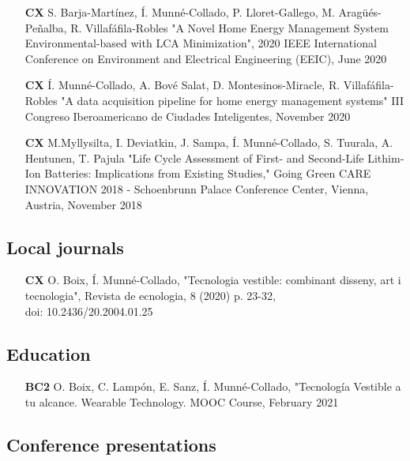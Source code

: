 \begin{itemize}
	\item [\textbf{CX}] S. Barja-Mart\'{i}nez, \'{I}. Munn\'{e}-Collado, P. Lloret-Gallego, M. Arag\"{u}\'{e}s-Pe\~{n}alba, R. Villaf\'{a}fila-Robles "A Novel Home Energy Management System Environmental-based with LCA Minimization", 2020 IEEE International Conference on Environment and Electrical Engineering (EEIC), June 2020
	\item [\textbf{CX}] \'{I}. Munn\'{e}-Collado, A. Bov\'{e} Salat, D. Montesinos-Miracle, R. Villaf\'{a}fila-Robles "A data acquisition pipeline for home energy management systems" III Congreso Iberoamericano de Ciudades Inteligentes, November 2020
	\item [\textbf{CX}] M.Myllysilta, I. Deviatkin, J. Sampa,  \'{I}. Munn\'{e}-Collado, S. Tuurala, A. Hentunen, T. Pajula  "Life Cycle Assessment of First- and Second-Life Lithim-Ion Batteries: Implications from Existing Studies," Going Green CARE INNOVATION 2018 - Schoenbrunn Palace Conference Center, Vienna, Austria, November 2018
	
\end{itemize}

\subsection*{Local journals}
\begin{itemize}
	\item [\textbf{CX}] O. Boix, \'{I}. Munn\'{e}-Collado, "Tecnologia vestible: combinant disseny, art i tecnologia", Revista de ecnologia, 8 (2020) p. 23-32,  \\doi: 10.2436/20.2004.01.25
\end{itemize}

\subsection*{Education}

\begin{itemize}
	\item [\textbf{BC2}] O. Boix, C. Lamp\'{o}n, E. Sanz, \'{I}. Munn\'{e}-Collado, "Tecnolog\'{i}a Vestible a tu alcance. Wearable Technology. MOOC Course, February 2021	
\end{itemize}


\subsection*{Conference presentations}


